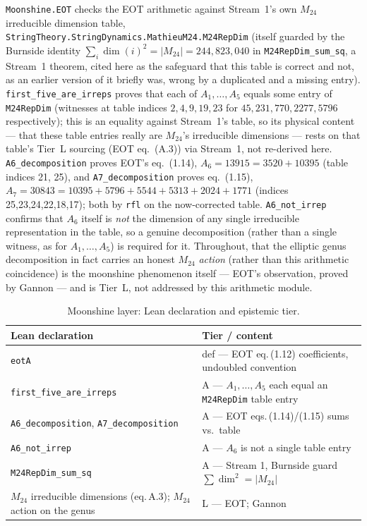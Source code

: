 \documentclass[11pt,a4paper]{article}
\theoremstyle{remark}
\begin{document}
\texttt{Moonshine.EOT} checks the EOT arithmetic against Stream~1's own $M_{24}$ irreducible
dimension table, \texttt{StringTheory.StringDynamics.MathieuM24.M24RepDim} (itself guarded by the
Burnside identity $\sum_i \dim(i)^2=|M_{24}|=244{,}823{,}040$ in
\texttt{M24RepDim\_sum\_sq}, a Stream~1 theorem, cited here as the safeguard that this table is
correct and not, as an earlier version of it briefly was, wrong by a duplicated and a missing
entry). \texttt{first\_five\_are\_irreps} proves that each of $A_1,\dots,A_5$ equals some entry of
\texttt{M24RepDim} (witnesses at table indices $2,4,9,19,23$ for $45,231,770,2277,5796$
respectively); this is an equality against Stream~1's table, so its physical content --- that
these table entries really are $M_{24}$'s irreducible dimensions --- rests on that table's Tier~L
sourcing (EOT eq.~(A.3)) via Stream~1, not re-derived here. \texttt{A6\_decomposition} proves EOT's
eq.~(1.14), $A_6=13915=3520+10395$ (table indices 21, 25), and \texttt{A7\_decomposition} proves
eq.~(1.15), $A_7=30843=10395+5796+5544+5313+2024+1771$ (indices 25,23,24,22,18,17); both by
\texttt{rfl} on the now-corrected table. \texttt{A6\_not\_irrep} confirms that $A_6$ itself is
\emph{not} the dimension of any single irreducible representation in the table, so a genuine
decomposition (rather than a single witness, as for $A_1,\dots,A_5$) is required for it. Throughout,
that the elliptic genus decomposition in fact carries an honest $M_{24}$ \emph{action} (rather than
this arithmetic coincidence) is the moonshine phenomenon itself --- EOT's observation, proved by
Gannon \cite{Gannon2016} --- and is Tier~L, not addressed by this arithmetic module.

\begin{table}[htbp]
\centering\footnotesize
\caption{Moonshine layer: Lean declaration and epistemic tier.}
\label{tab:moonshine}
\begin{tabular}{@{}l l@{}}
\toprule
\textbf{Lean declaration} & \textbf{Tier / content} \\ \midrule
\texttt{eotA} & def --- EOT eq.\,(1.12) coefficients, undoubled convention \\
\texttt{first\_five\_are\_irreps} & A --- $A_1,\dots,A_5$ each equal an \texttt{M24RepDim} table entry \\
\texttt{A6\_decomposition}, \texttt{A7\_decomposition} & A --- EOT eqs.\,(1.14)/(1.15) sums vs.\ table \\
\texttt{A6\_not\_irrep} & A --- $A_6$ is not a single table entry \\
\texttt{M24RepDim\_sum\_sq} & A --- Stream 1, Burnside guard $\sum\dim^2=|M_{24}|$ \\
$M_{24}$ irreducible dimensions (eq.\,A.3); $M_{24}$ action on the genus & L --- EOT; Gannon \\
\bottomrule
\end{tabular}
\end{table}
\end{document}
